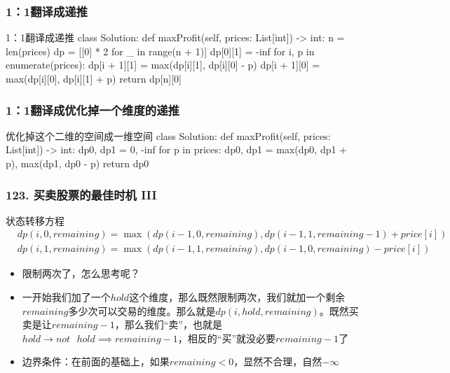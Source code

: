 \begin{frame}[fragile]
  \frametitle{1：1翻译成递推}
  \begin{codeblock}[language=python]{1：1翻译成递推}
class Solution:
    def maxProfit(self, prices: List[int]) -> int:
        n = len(prices)
        dp = [[0] * 2 for _ in range(n + 1)]
        dp[0][1] = -inf
        for i, p in enumerate(prices):
            dp[i + 1][1] = max(dp[i][1], dp[i][0] - p)
            dp[i + 1][0] = max(dp[i][0], dp[i][1] + p)
        return dp[n][0]
  \end{codeblock}
\end{frame}

\begin{frame}[fragile]
  \frametitle{1：1翻译成优化掉一个维度的递推}
  \begin{codeblock}[language=python]{优化掉这个二维的空间成一维空间}
class Solution:
    def maxProfit(self, prices: List[int]) -> int:
        dp0, dp1 = 0, -inf
        for p in prices:
            dp0, dp1 = max(dp0, dp1 + p), max(dp1, dp0 - p)
        return dp0
  \end{codeblock}
\end{frame}


\begin{frame}[fragile]          %
  \frametitle{\textsc{123. 买卖股票的最佳时机 III}}
    \begin{alertblock}{状态转移方程}
    \begin{align}
      &dp(i,0,remaining)=\max(dp(i-1,0,remaining),dp(i-1,1,remaining-1)+price[i])\\
      &dp(i,1,remaining)=\max(dp(i-1,1,remaining),dp(i-1,0,remaining)-price[i])
    \end{align}
  \end{alertblock}
  \begin{itemize}
    \item 限制两次了，怎么思考呢？
    \item 一开始我们加了一个$hold$这个维度，那么既然限制两次，我们就加一个剩余$remaining$多少次可以交易的维度。那么就是$dp(i,hold,remaining)$。既然买卖是让$remaining-1$，那么我们“卖”，也就是$hold \to not\text{ } hold\implies remaining-1$，相反的“买”就没必要$remaining-1$了
    \item 边界条件：在前面的基础上，如果$remaining<0$，显然不合理，自然$-\infty$
  \end{itemize}
\end{frame}


